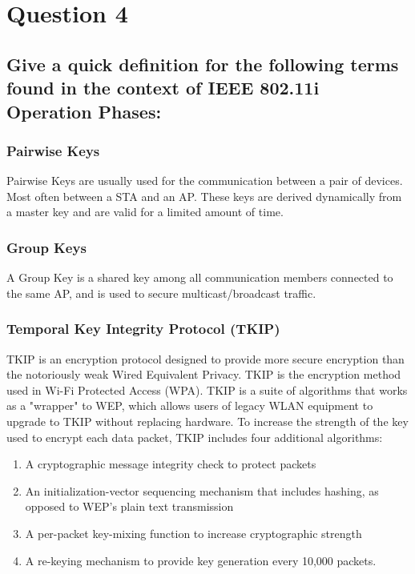 \documentclass{report}
\begin{document}
	\section{Question 4}
	\startsection
		\renewcommand{\thesubsection}{\thesection.\Alph{subsection}}
		\subsection{Give a quick definition for the following terms found in the context of IEEE 802.11i Operation Phases:}
		\startsubsection
			\subsubsection{Pairwise Keys}
			\startsubsection
				Pairwise Keys are usually used for the communication between a pair of devices. Most often between a STA and an AP. These keys are derived dynamically from a master key and are valid for a limited amount of time.
			\closesection
			\subsubsection{Group Keys}
			\startsubsection
				A Group Key is a shared key among all communication members connected to the same AP, and is used to secure multicast/broadcast traffic.
			\closesection
			\subsubsection{Temporal Key Integrity Protocol (TKIP)}
			\startsubsection
				TKIP is an encryption protocol designed to provide more secure encryption than the notoriously weak Wired Equivalent Privacy. TKIP is the encryption method used in Wi-Fi Protected Access (WPA). TKIP is a suite of algorithms that works as a "wrapper" to WEP, which allows users of legacy WLAN equipment to upgrade to TKIP without replacing hardware. To increase the strength of the key used to encrypt each data packet, TKIP includes four additional algorithms:
				\begin{enumerate}[-]
					\item A cryptographic message integrity check to protect packets
					\item An initialization-vector sequencing mechanism that includes hashing, as opposed to WEP's plain text transmission
					\item A per-packet key-mixing function to increase cryptographic strength
					\item A re-keying mechanism to provide key generation every 10,000 packets.
				\end{enumerate}
			\closesection
\end{document}
